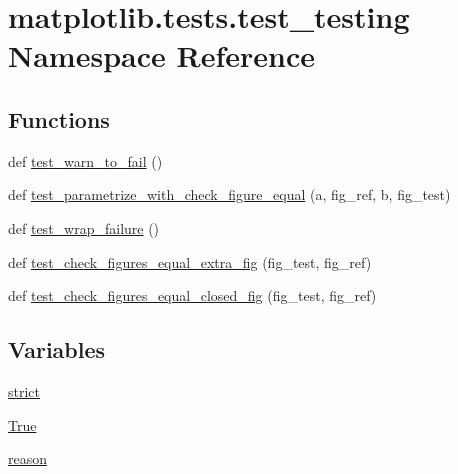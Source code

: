 \hypertarget{namespacematplotlib_1_1tests_1_1test__testing}{}\section{matplotlib.\+tests.\+test\+\_\+testing Namespace Reference}
\label{namespacematplotlib_1_1tests_1_1test__testing}
\subsection*{Functions}
\begin{DoxyCompactItemize}
\item 
def \hyperlink{namespacematplotlib_1_1tests_1_1test__testing_a62e98a79fbd1ecbd763c755595d96ad5}{test\+\_\+warn\+\_\+to\+\_\+fail} ()
\item 
def \hyperlink{namespacematplotlib_1_1tests_1_1test__testing_a8b38234432c027a90336c22602d0f46c}{test\+\_\+parametrize\+\_\+with\+\_\+check\+\_\+figure\+\_\+equal} (a, fig\+\_\+ref, b, fig\+\_\+test)
\item 
def \hyperlink{namespacematplotlib_1_1tests_1_1test__testing_a1d397f802c3fbea16e44d6e6678d444f}{test\+\_\+wrap\+\_\+failure} ()
\item 
def \hyperlink{namespacematplotlib_1_1tests_1_1test__testing_a33a2aae568720c1cd7789d0c6b1b632b}{test\+\_\+check\+\_\+figures\+\_\+equal\+\_\+extra\+\_\+fig} (fig\+\_\+test, fig\+\_\+ref)
\item 
def \hyperlink{namespacematplotlib_1_1tests_1_1test__testing_a5d51a3e1e269ea669610550d63da18c9}{test\+\_\+check\+\_\+figures\+\_\+equal\+\_\+closed\+\_\+fig} (fig\+\_\+test, fig\+\_\+ref)
\end{DoxyCompactItemize}
\subsection*{Variables}
\begin{DoxyCompactItemize}
\item 
\hyperlink{namespacematplotlib_1_1tests_1_1test__testing_ae48855093f869ecd721028426804d520}{strict}
\item 
\hyperlink{namespacematplotlib_1_1tests_1_1test__testing_af6e291b1ba5b01deebff6eee21185691}{True}
\item 
\hyperlink{namespacematplotlib_1_1tests_1_1test__testing_a171eb58abe81aee5909b58d0a45ab5d5}{reason}
\end{DoxyCompactItemize}



